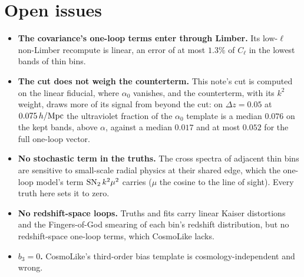 \documentclass[11pt]{article}
\newcommand{\hMpc}{\,h/{\rm Mpc}}
\begin{document}
\section{Open issues}
\label{app:open}

\begin{itemize}
  \item \textbf{The covariance's one-loop terms enter through Limber.}
    Its low-$\ell$ non-Limber recompute is linear, an error of at most
    $1.3\%$ of $C_\ell$ in the lowest bands of thin bins.
  \item \textbf{The cut does not weigh the counterterm.}  This note's
    cut is computed on the linear fiducial, where $\alpha_0$ vanishes,
    and the counterterm, with its $k^2$ weight, draws more of its
    signal from beyond the cut: on $\Delta z = 0.05$ at $0.075\hMpc$
    the ultraviolet fraction of the $\alpha_0$ template is a median
    $0.076$ on the kept bands, above $\alpha$, against a median
    $0.017$ and at most $0.052$ for the full one-loop vector.
  \item \textbf{No stochastic term in the truths.}  The cross spectra
    of adjacent thin bins are sensitive to small-scale radial physics
    at their shared edge, which the one-loop model's term
    ${\rm SN}_2\,k^2\mu^2$
    carries ($\mu$ the cosine to the line of sight).  Every truth here
    sets it to zero.
  \item \textbf{No redshift-space loops.}  Truths and fits carry
    linear Kaiser distortions and the Fingers-of-God smearing of each
    bin's redshift distribution, but no redshift-space one-loop terms,
    which CosmoLike lacks.
  \item \textbf{$b_3 = 0$.}  CosmoLike's third-order bias template is
    cosmology-independent and wrong.
\end{itemize}
\end{document}

